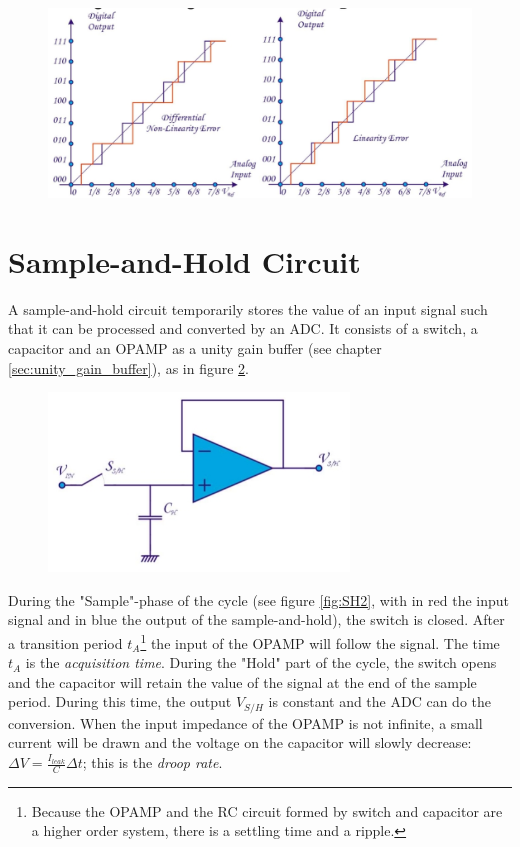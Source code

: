 \begin{figure}[h!]
	\centering
	\includegraphics[width=14cm]{figures/ch18/adc_char3.jpg}
	\caption{}
	\label{fig:adc_char3}
\end{figure}

\section{Sample-and-Hold Circuit}
A sample-and-hold circuit temporarily stores the value of an input signal such that it can be processed and converted by an ADC. It consists of a switch, a capacitor and an OPAMP as a unity gain buffer (see chapter \ref{sec:unity_gain_buffer}), as in figure \ref{fig:SH1}.\\
\begin{figure}[h!]
	\centering
	\includegraphics[width=8cm]{figures/ch18/SH1.jpg}
	\caption{}
	\label{fig:SH1}
\end{figure}
During the "Sample"-phase of the cycle (see figure \ref{fig:SH2}, with in red the input signal and in blue the output of the sample-and-hold), the switch is closed. After a transition period $t_A$\footnote{Because the OPAMP and the RC circuit formed by switch and capacitor are a higher order system, there is a settling time and a ripple.} the input of the OPAMP will follow the signal. The time $t_A$ is the \emph{acquisition time}. During the "Hold" part of the cycle, the switch opens and the capacitor will retain the value of the signal at the end of the sample period. During this time, the output $V_{S/H}$ is constant and the ADC can do the conversion. When the input impedance of the OPAMP is not infinite, a small current will be drawn and the voltage on the capacitor will slowly decrease: $\Delta V = \frac{I_{leak}}{C} \Delta t$; this is the \emph{droop rate}.

